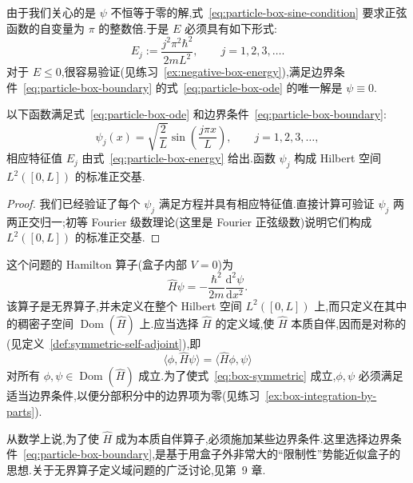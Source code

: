 由于我们关心的是 \(\psi\) 不恒等于零的解,式~\eqref{eq:particle-box-sine-condition} 要求正弦函数的自变量为 \(\pi\) 的整数倍.于是 \(E\) 必须具有如下形式:
\begin{equation}
E_{j}:=\frac{j^{2}\pi^{2}\hbar^{2}}{2mL^{2}},
\qquad j=1,2,3,\ldots.
\label{eq:particle-box-energy}
\end{equation}
对于 \(E\le0\),很容易验证(见练习~\ref{ex:negative-box-energy}),满足边界条件~\eqref{eq:particle-box-boundary} 的式~\eqref{eq:particle-box-ode} 的唯一解是 \(\psi\equiv0\).

\begin{proposition}[盒中粒子的能级与本征函数]\label{prop:particle-in-box}
以下函数满足式~\eqref{eq:particle-box-ode} 和边界条件~\eqref{eq:particle-box-boundary}:
\begin{equation}
\psi_{j}(x)=\sqrt{\frac{2}{L}}\sin\left(\frac{j\pi x}{L}\right),
\qquad j=1,2,3,\ldots,
\label{eq:particle-box-eigenfunctions}
\end{equation}
相应特征值 \(E_{j}\) 由式~\eqref{eq:particle-box-energy} 给出.函数 \(\psi_{j}\) 构成 Hilbert 空间 \(L^{2}([0,L])\) 的标准正交基.
\end{proposition}

\begin{proof}
我们已经验证了每个 \(\psi_{j}\) 满足方程并具有相应特征值.直接计算可验证 \(\psi_{j}\) 两两正交归一;初等 Fourier 级数理论(这里是 Fourier 正弦级数)说明它们构成 \(L^{2}([0,L])\) 的标准正交基.
\end{proof}

这个问题的 Hamilton 算子(盒子内部 \(V=0\))为
\[
\widehat H\psi=-\frac{\hbar^{2}}{2m}\frac{\mathrm{d}^{2}\psi}{\mathrm{d}x^{2}}.
\]
该算子是无界算子,并未定义在整个 Hilbert 空间 \(L^{2}([0,L])\) 上,而只定义在其中的稠密子空间 \(\operatorname{Dom}(\widehat H)\) 上.应当选择 \(\widehat H\) 的定义域,使 \(\widehat H\) 本质自伴,因而是对称的(见定义~\ref{def:symmetric-self-adjoint}),即
\begin{equation}
\langle\phi,\widehat H\psi\rangle=\langle\widehat H\phi,\psi\rangle
\label{eq:box-symmetric}
\end{equation}
对所有 \(\phi,\psi\in\operatorname{Dom}(\widehat H)\) 成立.为了使式~\eqref{eq:box-symmetric} 成立,\(\phi,\psi\) 必须满足适当边界条件,以便分部积分中的边界项为零(见练习~\ref{ex:box-integration-by-parts}).

从数学上说,为了使 \(\widehat H\) 成为本质自伴算子,必须施加某些边界条件.这里选择边界条件~\eqref{eq:particle-box-boundary},是基于用盒子外非常大的“限制性”势能近似盒子的思想.关于无界算子定义域问题的广泛讨论,见第~9 章.

